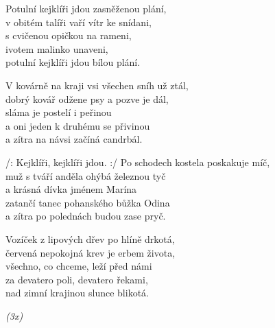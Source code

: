 
\ve{}
Potulní kejklíři jdou zasněženou plání, \quad {}\\
v obitém talíři vaří vítr ke snídani, \quad {}\\
s cvičenou opičkou na rameni,\\ 
ivotem malinko unaveni, \\
potulní kejklíři jdou bílou plání. \quad {} \quad {} \quad {} 

\ve{}
V kovárně na kraji vsi všechen sníh už ztál,\\
dobrý kovář odžene psy a pozve je dál,\\
sláma je postelí i peřinou\\
a oni jeden k druhému se přivinou\\
a zítra na návsi začíná candrbál.

\cho{}
/: Kejklíři, kejklíři jdou.  :/  \quad {} \quad {}
\ve{}
Po schodech kostela poskakuje míč, \\
muž s tváří anděla ohýbá železnou tyč \\
a krásná dívka jménem Marína \\
zatančí tanec pohanského bůžka Odina \\
a zítra po polednách budou zase pryč. 

\ve{}
Vozíček z lipových dřev po hlíně drkotá, \\
červená nepokojná krev je erbem života, \\
všechno, co chceme, leží před námi \\
za devatero poli, devatero řekami, \\
nad zimní krajinou slunce blikotá. 

\cho{} \textit{(3x)}

\esong